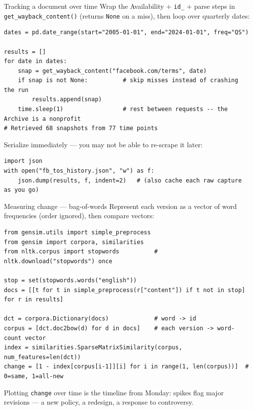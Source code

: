 \documentclass[9pt,aspectratio=169]{beamer}
\begin{document}
\begin{frame}[fragile]{Tracking a document over time}
    Wrap the Availability + \texttt{id\_} + parse steps in \texttt{get\_wayback\_content()} (returns \texttt{None} on a miss), then loop over quarterly dates:
\begin{lstlisting}
dates = pd.date_range(start="2005-01-01", end="2024-01-01", freq="QS")

results = []
for date in dates:
    snap = get_wayback_content("facebook.com/terms", date)
    if snap is not None:          # skip misses instead of crashing the run
        results.append(snap)
    time.sleep(1)                 # rest between requests -- the Archive is a nonprofit
# Retrieved 68 snapshots from 77 time points
\end{lstlisting}
    Serialize immediately --- you may not be able to re-scrape it later:
\begin{lstlisting}
import json
with open("fb_tos_history.json", "w") as f:
    json.dump(results, f, indent=2)   # (also cache each raw capture as you go)
\end{lstlisting}
\end{frame}

\begin{frame}[fragile]{Measuring change --- bag-of-words}
    Represent each version as a vector of word frequencies (order ignored), then compare vectors:
\begin{lstlisting}
from gensim.utils import simple_preprocess
from gensim import corpora, similarities
from nltk.corpus import stopwords          # nltk.download("stopwords") once

stop = set(stopwords.words("english"))
docs = [[t for t in simple_preprocess(r["content"]) if t not in stop] for r in results]

dct = corpora.Dictionary(docs)             # word -> id
corpus = [dct.doc2bow(d) for d in docs]    # each version -> word-count vector
index = similarities.SparseMatrixSimilarity(corpus, num_features=len(dct))
change = [1 - index[corpus[i-1]][i] for i in range(1, len(corpus))]  # 0=same, 1=all-new
\end{lstlisting}
    Plotting \texttt{change} over time is the timeline from Monday: spikes flag major revisions --- a new policy, a redesign, a response to controversy.
\end{frame}
\end{document}
